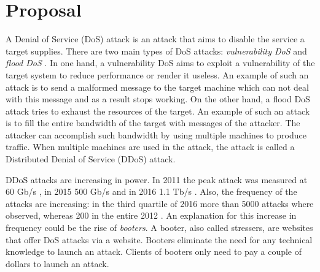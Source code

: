 \section{Proposal} \label{sec:introduction}
A Denial of Service (DoS) attack is an attack that aims to disable the service a target supplies. There are two main types of DoS attacks: \textit{vulnerability DoS} and \textit{flood DoS} \cite{Lin2013}. In one hand, a vulnerability DoS aims to exploit a vulnerability of the target system to reduce performance or render it useless. An example of such an attack is to send a malformed message to the target machine which can not deal with this message and as a result stops working. On the other hand, a flood DoS attack tries to exhaust the resources of the target. An example of such an attack is to fill the entire bandwidth of the target with messages of the attacker. The attacker can accomplish such bandwidth by using multiple machines to produce traffic. When multiple machines are used in the attack, the attack is called a Distributed Denial of Service (DDoS) attack.  

DDoS attacks are increasing in power. In 2011 the peak attack was measured at 60 Gb/s \cite{Arbor2014}, in 2015 500 Gb/s and in 2016 1.1 Tb/s \cite{Akamai2017}. Also, the frequency of the attacks are increasing: in the third quartile of 2016 more than 5000 attacks where observed, whereas 200 in the entire 2012 \cite{Akamai2016}. An explanation for this increase in frequency could be the rise of \textit{booters}\cite{Santana2017}. A booter, also called stressers, are websites that offer DoS attacks via a website. Booters eliminate the need for any technical knowledge to launch an attack. Clients of booters only need to pay a couple of dollars to launch an attack.

